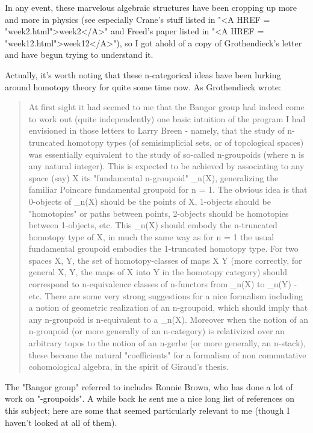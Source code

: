 In any event, these marvelous algebraic structures have been cropping up
more and more in physics (see especially Crane's stuff listed in
"<A HREF = "week2.html">week2</A>" and Freed's paper listed in "<A HREF = "week12.html">week12</A>"), so I got ahold of a copy
of Grothendieck's letter and have begun trying to understand it.  

Actually, it's worth noting that these n-categorical ideas have been
lurking around homotopy theory for quite some time now.  As Grothendieck wrote:

\begin{quote}
At first sight it had seemed to me that the Bangor group had indeed
come to work out (quite independently) one basic intuition of the
program I had envisioned in those letters to Larry Breen - namely,
that the study of n-truncated homotopy types (of semisimplicial sets,
or of topological spaces) was essentially equivalent to the study of
so-called n-groupoids (where n is any natural integer).  This is
expected to be achieved by associating to any space (say) X its
"fundamental n-groupoid" \Pi _{n}(X), generalizing the
familiar Poincare fundamental groupoid for n = 1.  The obvious idea is
that 0-objects of \Pi _{n}(X) should be the points of X,
1-objects should be "homotopies" or paths between points, 2-objects
should be homotopies between 1-objects, etc.  This \Pi _{n}(X)
should embody the n-truncated homotopy type of X, in much the same way
as for n = 1 the usual fundamental groupoid embodies the 1-truncated
homotopy type.  For two spaces X, Y, the set of homotopy-classes of
maps X \to  Y (more correctly, for general X, Y, the maps of X into
Y in the homotopy category) should correspond to n-equivalence classes
of n-functors from \Pi _{n}(X) to \Pi _{n}(Y) - etc.
There are some very strong suggestions for a nice formalism including
a notion of geometric realization of an n-groupoid, which should imply
that any n-groupoid is n-equivalent to a \Pi _{n}(X).
Moreover when the notion of an n-groupoid (or more generally of an
n-category) is relativized over an arbitrary topos to the notion of an
n-gerbe (or more generally, an n-stack), these become the natural
"coefficients" for a formalism of non commutative
cohomological algebra, in the spirit of Giraud's thesis.\end{quote}

The "Bangor group" referred to includes Ronnie Brown, who
has done a lot of work on "\omega -groupoids".  A while back
he sent me a nice long list of references on this subject; here are
some that seemed particularly relevant to me (though I haven't looked
at all of them).

